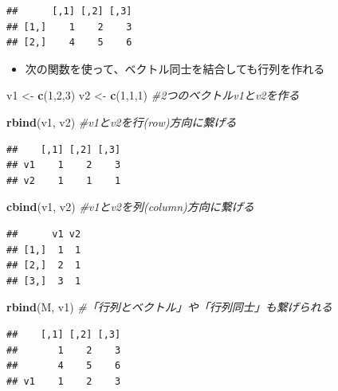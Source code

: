 \documentclass[
]{book}
\newenvironment{Shaded}{\begin{snugshade}}{\end{snugshade}}
\newcommand{\CommentTok}[1]{\textcolor[rgb]{0.56,0.35,0.01}{\textit{#1}}}
\newcommand{\DecValTok}[1]{\textcolor[rgb]{0.00,0.00,0.81}{#1}}
\newcommand{\FunctionTok}[1]{\textcolor[rgb]{0.13,0.29,0.53}{\textbf{#1}}}
\newcommand{\NormalTok}[1]{#1}
\newcommand{\OtherTok}[1]{\textcolor[rgb]{0.56,0.35,0.01}{#1}}
\providecommand{\tightlist}{%
  \setlength{\itemsep}{0pt}\setlength{\parskip}{0pt}}
\begin{document}
\begin{verbatim}
##      [,1] [,2] [,3]
## [1,]    1    2    3
## [2,]    4    5    6
\end{verbatim}

\begin{itemize}
\tightlist
\item
  次の関数を使って、ベクトル同士を結合しても行列を作れる
\end{itemize}

\begin{Shaded}
\begin{Highlighting}[]
\NormalTok{v1 }\OtherTok{\textless{}{-}} \FunctionTok{c}\NormalTok{(}\DecValTok{1}\NormalTok{,}\DecValTok{2}\NormalTok{,}\DecValTok{3}\NormalTok{) }
\NormalTok{v2 }\OtherTok{\textless{}{-}} \FunctionTok{c}\NormalTok{(}\DecValTok{1}\NormalTok{,}\DecValTok{1}\NormalTok{,}\DecValTok{1}\NormalTok{) }\CommentTok{\#2つのベクトルv1とv2を作る}

\FunctionTok{rbind}\NormalTok{(v1, v2) }\CommentTok{\#v1とv2を行(row)方向に繋げる}
\end{Highlighting}
\end{Shaded}

\begin{verbatim}
##    [,1] [,2] [,3]
## v1    1    2    3
## v2    1    1    1
\end{verbatim}

\begin{Shaded}
\begin{Highlighting}[]
\FunctionTok{cbind}\NormalTok{(v1, v2) }\CommentTok{\#v1とv2を列(column)方向に繋げる}
\end{Highlighting}
\end{Shaded}

\begin{verbatim}
##      v1 v2
## [1,]  1  1
## [2,]  2  1
## [3,]  3  1
\end{verbatim}

\begin{Shaded}
\begin{Highlighting}[]
\FunctionTok{rbind}\NormalTok{(M, v1) }\CommentTok{\#「行列とベクトル」や「行列同士」も繋げられる}
\end{Highlighting}
\end{Shaded}

\begin{verbatim}
##    [,1] [,2] [,3]
##       1    2    3
##       4    5    6
## v1    1    2    3
\end{verbatim}
\end{document}
